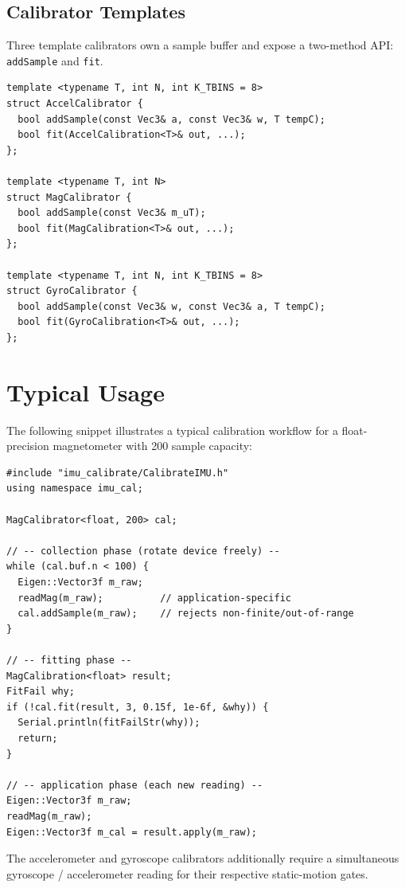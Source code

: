 \documentclass[conference]{IEEEtran}
\begin{document}
    \subsection{Calibrator Templates}

    Three template calibrators own a sample buffer and expose a
    two-method API: \texttt{addSample} and \texttt{fit}.

    \begin{lstlisting}
template <typename T, int N, int K_TBINS = 8>
struct AccelCalibrator {
  bool addSample(const Vec3& a, const Vec3& w, T tempC);
  bool fit(AccelCalibration<T>& out, ...);
};

template <typename T, int N>
struct MagCalibrator {
  bool addSample(const Vec3& m_uT);
  bool fit(MagCalibration<T>& out, ...);
};

template <typename T, int N, int K_TBINS = 8>
struct GyroCalibrator {
  bool addSample(const Vec3& w, const Vec3& a, T tempC);
  bool fit(GyroCalibration<T>& out, ...);
};
    \end{lstlisting}

    \section{Typical Usage}
    \label{sec:usage}

    The following snippet illustrates a typical calibration workflow
    for a float-precision magnetometer with 200 sample capacity:

    \begin{lstlisting}
#include "imu_calibrate/CalibrateIMU.h"
using namespace imu_cal;

MagCalibrator<float, 200> cal;

// -- collection phase (rotate device freely) --
while (cal.buf.n < 100) {
  Eigen::Vector3f m_raw;
  readMag(m_raw);          // application-specific
  cal.addSample(m_raw);    // rejects non-finite/out-of-range
}

// -- fitting phase --
MagCalibration<float> result;
FitFail why;
if (!cal.fit(result, 3, 0.15f, 1e-6f, &why)) {
  Serial.println(fitFailStr(why));
  return;
}

// -- application phase (each new reading) --
Eigen::Vector3f m_raw;
readMag(m_raw);
Eigen::Vector3f m_cal = result.apply(m_raw);
    \end{lstlisting}

    The accelerometer and gyroscope calibrators additionally require a
    simultaneous gyroscope / accelerometer reading for their respective
    static-motion gates.
\end{document}
